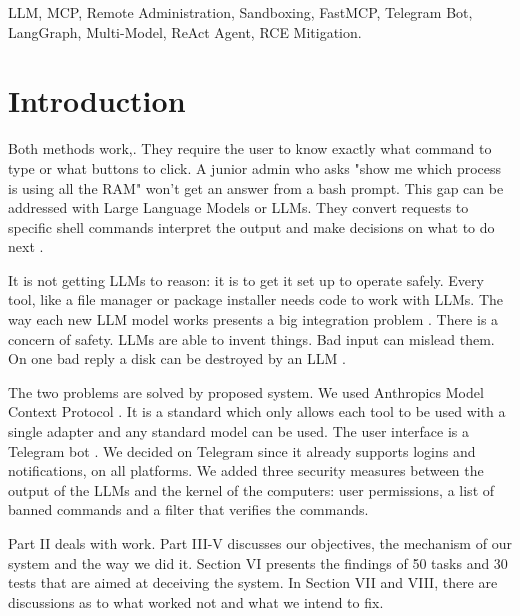 \documentclass[conference]{IEEEtran}
\begin{document}
\begin{IEEEkeywords}
LLM, MCP, Remote Administration, Sandboxing, FastMCP, Telegram Bot, LangGraph, Multi-Model, ReAct Agent, RCE Mitigation.
\end{IEEEkeywords}

\section{Introduction}
Both methods work,. They require the user to know exactly what command to type or what buttons to click. A junior admin who asks "show me which process is using all the RAM" won't get an answer from a bash prompt. This gap can be addressed with Large Language Models or LLMs. They convert requests to specific shell commands interpret the output and make decisions on what to do next \cite{wang2023survey, yao2023react}.

It is not getting LLMs to reason: it is to get it set up to operate safely. Every tool, like a file manager or package installer needs code to work with LLMs. The way each new LLM model works presents a big integration problem \cite{schick2023toolformer, patil2023gorilla}. There is a concern of safety. LLMs are able to invent things. Bad input can mislead them. On one bad reply a disk can be destroyed by an LLM \cite{greshake2023indirect, owasp2025llm}.

The two problems are solved by proposed system. We used Anthropics Model Context Protocol  \cite{anthropic2024mcp}. It is a standard which only allows each tool to be used with a single adapter and any standard model can be used. The user interface is a Telegram bot  \cite{telegram2023botapi}. We decided on Telegram since it already supports logins and notifications, on all platforms. We added three security measures between the output of the LLMs and the kernel of the computers: user permissions, a list of banned commands and a filter that verifies the commands.

Part II deals with work. Part III-V discusses our objectives, the mechanism of our system and the way we did it. Section VI presents the findings of 50 tasks and 30 tests that are aimed at deceiving the system. In Section VII and VIII, there are discussions as to what worked not and what we intend to fix.

\end{document}
